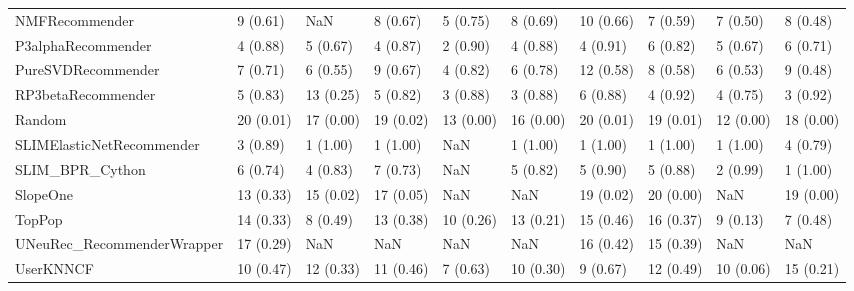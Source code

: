 \begin{tabular}{llllllllll}
                     NMFRecommender &                 9 (0.61) &         NaN &      8 (0.67) &     5 (0.75) &             8 (0.69) &           10 (0.66) &          7 (0.59) &           7 (0.50) &          8 (0.48) \\
                 P3alphaRecommender &                 4 (0.88) &    5 (0.67) &      4 (0.87) &     2 (0.90) &             4 (0.88) &            4 (0.91) &          6 (0.82) &           5 (0.67) &          6 (0.71) \\
                 PureSVDRecommender &                 7 (0.71) &    6 (0.55) &      9 (0.67) &     4 (0.82) &             6 (0.78) &           12 (0.58) &          8 (0.58) &           6 (0.53) &          9 (0.48) \\
                 RP3betaRecommender &                 5 (0.83) &   13 (0.25) &      5 (0.82) &     3 (0.88) &             3 (0.88) &            6 (0.88) &          4 (0.92) &           4 (0.75) &          3 (0.92) \\
                             Random &                20 (0.01) &   17 (0.00) &     19 (0.02) &    13 (0.00) &            16 (0.00) &           20 (0.01) &         19 (0.01) &          12 (0.00) &         18 (0.00) \\
          SLIMElasticNetRecommender &                 3 (0.89) &    1 (1.00) &      1 (1.00) &          NaN &             1 (1.00) &            1 (1.00) &          1 (1.00) &           1 (1.00) &          4 (0.79) \\
                    SLIM\_BPR\_Cython &                 6 (0.74) &    4 (0.83) &      7 (0.73) &          NaN &             5 (0.82) &            5 (0.90) &          5 (0.88) &           2 (0.99) &          1 (1.00) \\
                           SlopeOne &                13 (0.33) &   15 (0.02) &     17 (0.05) &          NaN &                  NaN &           19 (0.02) &         20 (0.00) &                NaN &         19 (0.00) \\
                             TopPop &                14 (0.33) &    8 (0.49) &     13 (0.38) &    10 (0.26) &            13 (0.21) &           15 (0.46) &         16 (0.37) &           9 (0.13) &          7 (0.48) \\
         UNeuRec\_RecommenderWrapper &                17 (0.29) &         NaN &           NaN &          NaN &                  NaN &           16 (0.42) &         15 (0.39) &                NaN &               NaN \\
                          UserKNNCF &                10 (0.47) &   12 (0.33) &     11 (0.46) &     7 (0.63) &            10 (0.30) &            9 (0.67) &         12 (0.49) &          10 (0.06) &         15 (0.21) \\
\bottomrule
\end{tabular}
